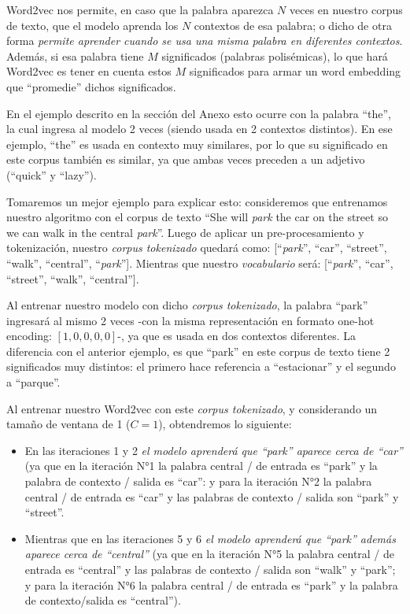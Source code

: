 \documentclass[12pt,a4paper]{article}
\begin{document}
\begin{sloppypar}
Word2vec nos permite, en caso que la palabra aparezca $N$ veces en nuestro corpus de texto, que el modelo aprenda los $N$ contextos de esa palabra; o dicho de otra forma \textit{permite aprender cuando se usa una misma palabra en diferentes contextos}. Además, si esa palabra tiene $M$ significados (palabras polisémicas), lo que hará Word2vec es tener en cuenta estos $M$ significados para armar un word embedding que “promedie” dichos significados. 

En el ejemplo descrito en la sección del Anexo \textit{} esto ocurre con la palabra “the”, la cual ingresa al modelo 2 veces (siendo usada en 2 contextos distintos). En ese ejemplo, “the” es usada en contexto muy similares, por lo que su significado en este corpus también es similar, ya que ambas veces preceden a un adjetivo (“quick” y “lazy”).

Tomaremos un mejor ejemplo para explicar esto: consideremos que entrenamos nuestro algoritmo con el corpus de texto “She will \textit{park} the car on the street so we can walk in the central \textit{park}”. Luego de aplicar un pre-procesamiento y tokenización, nuestro \textit{corpus tokenizado} quedará como: [“\textit{park}”, 
“car”, “street”, “walk”, “central”, “\textit{park}”]. Mientras que nuestro \textit{vocabulario} será: [“\textit{park}”, “car”, “street”, “walk”, “central”].

Al entrenar nuestro modelo con dicho \textit{corpus tokenizado}, la palabra “park” ingresará al mismo 2 veces -con la misma representación en formato one-hot encoding: $[1,0,0,0,0]$-, ya que es usada en dos contextos diferentes. La diferencia con el anterior ejemplo, es que “park” en este corpus de texto tiene 2 significados muy distintos: el primero hace referencia a “estacionar” y el segundo a “parque”. 

Al entrenar nuestro Word2vec con este \textit{corpus tokenizado}, y considerando un tamaño de ventana de 1 ($C=1$), obtendremos lo siguiente:

\begin{itemize}
\item En las iteraciones 1 y 2 \textit{el modelo aprenderá que “park” aparece cerca de “car”} (ya que en la iteración N°1 la palabra central / de entrada es “park” y la palabra de contexto / salida es “car”: y para la iteración N°2 la palabra central / de entrada es “car” y las palabras de contexto / salida son “park” y “street”. 
      
\item Mientras que en las iteraciones 5 y 6 \textit{el modelo aprenderá que “park” además aparece cerca de “central”} (ya que en la iteración N°5 la palabra central / de entrada es “central” y las palabras de contexto / salida son “walk” y “park”; y para la iteración N°6 la palabra central / de entrada es “park” y la palabra de contexto/salida es “central”).
\end{itemize}
      

\end{sloppypar}
\end{document}
